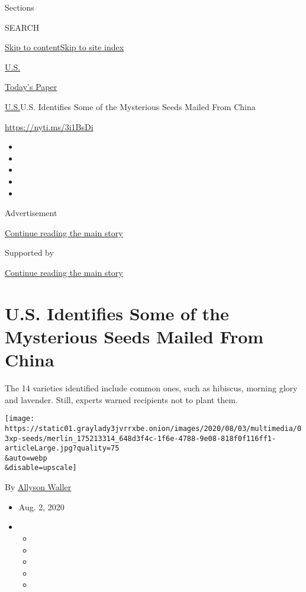 Sections

SEARCH

\protect\hyperlink{site-content}{Skip to
content}\protect\hyperlink{site-index}{Skip to site index}

\href{https://www.nytimes3xbfgragh.onion/section/us}{U.S.}

\href{https://myaccount.nytimes3xbfgragh.onion/auth/login?response_type=cookie\&client_id=vi}{}

\href{https://www.nytimes3xbfgragh.onion/section/todayspaper}{Today's
Paper}

\href{/section/us}{U.S.}\textbar{}U.S. Identifies Some of the Mysterious
Seeds Mailed From China

\url{https://nyti.ms/3i1BsDi}

\begin{itemize}
\item
\item
\item
\item
\item
\end{itemize}

Advertisement

\protect\hyperlink{after-top}{Continue reading the main story}

Supported by

\protect\hyperlink{after-sponsor}{Continue reading the main story}

\hypertarget{us-identifies-some-of-the-mysterious-seeds-mailed-from-china}{%
\section{U.S. Identifies Some of the Mysterious Seeds Mailed From
China}\label{us-identifies-some-of-the-mysterious-seeds-mailed-from-china}}

The 14 varieties identified include common ones, such as hibiscus,
morning glory and lavender. Still, experts warned recipients not to
plant them.

\texttt{[image: https://static01.graylady3jvrrxbe.onion/images/2020/08/03/multimedia/03xp-seeds/merlin\_175213314\_648d3f4c-1f6e-4788-9e08-818f0f116ff1-articleLarge.jpg?quality=75\\\&auto=webp\\\&disable=upscale]}

By \href{https://www.nytimes3xbfgragh.onion/by/allyson-waller}{Allyson
Waller}

\begin{itemize}
\item
  Aug. 2, 2020
\item
  \begin{itemize}
  \item
  \item
  \item
  \item
  \item
  \end{itemize}
\end{itemize}

